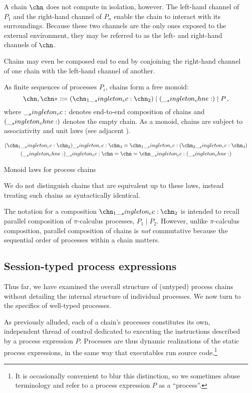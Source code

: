 A chain $\chn$ does not compute in isolation, however.
The left-hand channel of $P_1$ and the right-hand channel of $P_n$ enable the chain to interact with its surroundings.
Because these two channels are the only ones exposed to the external environment, they may be referred to as the left- and right-hand channels of $\chn$.

Chains may even be composed end to end by conjoining the right-hand channel of one chain with the left-hand channel of another.

As finite sequences of processes $P_i$, chains form a free monoid:
\begin{equation*}
  \chn,\chn* \Coloneqq (\chn_1 \cc \chn_2) \mid (\chne) \mid P
  \,,
\end{equation*}
where $\__singleton_cc:$ denotes end-to-end composition of chains and $(\__singleton_chne:)$ denotes the empty chain.
As a monoid, chains are subject to associativity and unit laws (see adjacent ).
\begin{marginfigure}
\begin{gather*}
  (\chn_1 \cc \chn_2) \cc \chn_3 = \chn_1 \cc (\chn_2 \cc \chn_3) \\
  (\chne) \cc \chn = \chn = \chn \cc (\chne)
\end{gather*}
\caption{Monoid laws for process chains}\label{fig:chains:monoid-laws}
\end{marginfigure}
We do not distinguish chains that are equivalent up to these laws, instead treating such chains as syntactically identical.

The notation for a composition $\chn_1 \cc \chn_2$ is intended to recall parallel composition of $\pi$-calculus processes, $P_1 \mid P_2$.
However, unlike $\pi$-calculus composition, parallel composition of chains is \emph{not} commutative because the sequential order of processes within a chain matters.


\subsection{Session-typed process expressions}\label{sec:process-chains:typed-processes}

Thus far, we have examined the overall structure of (untyped) process chains without detailing the internal structure of individual processes.
We now turn to the specifics of well-typed processes.

As previously alluded, each of a chain's processes constitutes its own, independent thread of control dedicated to executing the instructions described by a process expression $P$.
Processes are thus dynamic realizations of the static process expressions, in the same way that executables run source code.\footnote{It is occasionally convenient to blur this distinction, so we sometimes abuse terminology and refer to a process expression $P$ as a \enquote{process}.}

